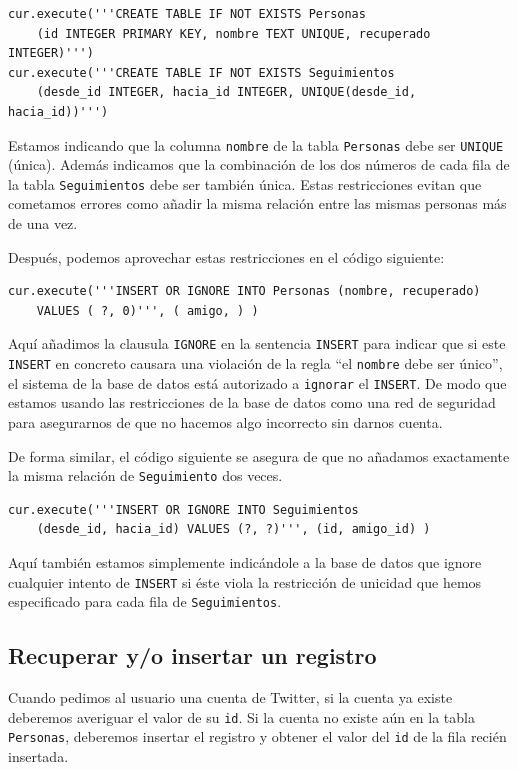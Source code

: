 \beforeverb
\begin{verbatim}
cur.execute('''CREATE TABLE IF NOT EXISTS Personas 
    (id INTEGER PRIMARY KEY, nombre TEXT UNIQUE, recuperado INTEGER)''')
cur.execute('''CREATE TABLE IF NOT EXISTS Seguimientos 
    (desde_id INTEGER, hacia_id INTEGER, UNIQUE(desde_id, hacia_id))''')
\end{verbatim}
\afterverb
%
Estamos indicando que la columna {\tt nombre} de la tabla {\tt Personas} debe ser
{\tt UNIQUE} (única). Además indicamos que la combinación de los dos números
de cada fila de la tabla {\tt Seguimientos} debe ser también única. Estas restricciones
evitan que cometamos errores como añadir la misma relación entre las mismas personas
más de una vez.

Después, podemos aprovechar estas restricciones en el código siguiente:

\beforeverb
\begin{verbatim}
cur.execute('''INSERT OR IGNORE INTO Personas (nombre, recuperado) 
    VALUES ( ?, 0)''', ( amigo, ) )
\end{verbatim}
\afterverb
%
Aquí añadimos la clausula {\tt IGNORE} en la sentencia {\tt INSERT} para indicar
que si este {\tt INSERT} en concreto causara una violación de la regla
``el {\tt nombre} debe ser único'', el sistema de la base de datos está autorizado
a {\tt ignorar} el {\tt INSERT}. De modo que estamos usando las restricciones de la base de datos
como una red de seguridad para asegurarnos de que no hacemos algo incorrecto sin darnos cuenta.

De forma similar, el código siguiente se asegura de que no añadamos exactamente
la misma relación de {\tt Seguimiento} dos veces.

\beforeverb
\begin{verbatim}
cur.execute('''INSERT OR IGNORE INTO Seguimientos 
    (desde_id, hacia_id) VALUES (?, ?)''', (id, amigo_id) )
\end{verbatim}
\afterverb
%
Aquí también estamos simplemente indicándole a la base de datos que ignore cualquier intento
de {\tt INSERT} si éste viola la restricción de unicidad
que hemos especificado para cada fila de {\tt Seguimientos}.

\subsection{Recuperar y/o insertar un registro}

Cuando pedimos al usuario una cuenta de Twitter, si la cuenta ya
existe deberemos averiguar el valor de su {\tt id}. Si la cuenta
no existe aún en la tabla {\tt Personas}, deberemos insertar
el registro y obtener el valor del {\tt id} de la fila
recién insertada.

